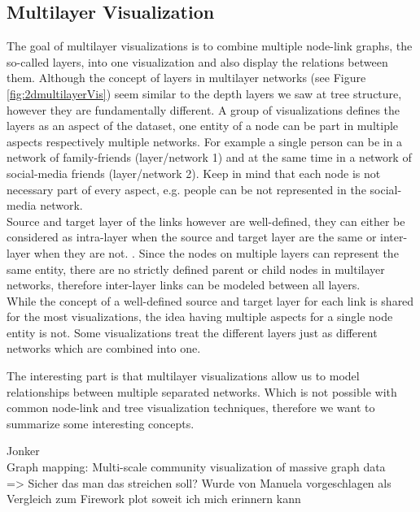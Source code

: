 \subsection{Multilayer Visualization}
The goal of multilayer visualizations is to combine multiple node-link graphs, the so-called layers, into one visualization and also display the relations between them. Although the concept of layers in multilayer networks (see Figure \ref{fig:2dmultilayerVis}) seem similar to the depth layers we saw at tree structure, however they are fundamentally different. A group of visualizations defines the layers as an aspect of the dataset, one entity of a node can be part in multiple aspects respectively multiple networks. For example a single person can be in a network of family-friends (layer/network 1) and at the same time in a network of social-media friends (layer/network 2). Keep in mind that each node is not necessary part of every aspect, e.g. people can be not represented in the social-media network.\\
Source and target layer of the links however are well-defined, they can either be considered as intra-layer when the source and target layer are the same or inter-layer when they are not. \cite{ghoniem_state_2019}. Since the nodes on multiple layers can represent the same entity, there are no strictly defined parent or child nodes in multilayer networks, therefore inter-layer links can be modeled between all layers.\\
While the concept of a well-defined source and target layer for each link is shared for the most visualizations, the idea having multiple aspects for a single node entity is not. Some visualizations treat the different layers just as different networks which are combined into one. 

The interesting part is that multilayer visualizations allow us to model relationships between multiple separated networks. Which is not possible with common node-link and tree visualization techniques, therefore we want to summarize some interesting concepts.


Jonker\\
Graph mapping: Multi-scale community visualization of massive graph data\\
=> Sicher das man das streichen soll? Wurde von Manuela vorgeschlagen als Vergleich zum Firework plot soweit ich mich erinnern kann

